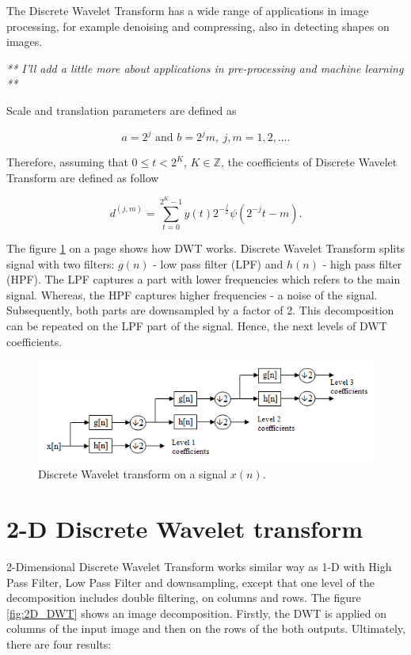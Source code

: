 The Discrete Wavelet Transform has a wide range of applications in image processing, for example denoising and compressing, also in detecting shapes on images.

\textit{** I'll add a little more about applications in pre-processing and machine learning **}

Scale and translation parameters are defined as

\begin{equation}
a = 2^j \text{ and } b = 2^j m,\ j,m=1,2,\ldots.
\end{equation}

Therefore, assuming that $0 \leq t < 2^K$, $K \in \mathbb{Z}$, the coefficients of Discrete Wavelet Transform are defined as follow

\begin{equation}
d^{(j,m)}=\sum_{t=0}^{2^K -1} y(t) 2^{-\frac{j}{2}} \psi\left(2^{-j}t - m\right).
\end{equation}

The figure \ref{fig:DWT} on a page \pageref{fig:DWT} shows how DWT works. Discrete Wavelet Transform splits signal with two filters: $g(n)$ - low pass filter (LPF) and $h(n)$ - high pass filter (HPF). The LPF captures a part with lower frequencies which refers to the main signal. Whereas, the HPF captures higher frequencies - a noise of the signal. Subsequently, both parts are downsampled by a factor of 2. This decomposition can be repeated on the LPF part of the signal. Hence, the next levels of DWT coefficients.

\begin{figure}[h]
	\centering
	\includegraphics[width=\textwidth]{DWT.png}
	\caption{Discrete Wavelet transform on a signal $x(n)$.}
	\label{fig:DWT}
\end{figure}


\section{2-D Discrete Wavelet transform}
\label{sec:2D_DWT}

2-Dimensional Discrete Wavelet Transform works similar way as 1-D with High Pass Filter, Low Pass Filter and downsampling, except that one level of the decomposition includes double filtering, on columns and rows. The figure \ref{fig:2D_DWT} shows an image decomposition. Firstly, the DWT is applied on columns of the input image and then on the rows of the both outputs. Ultimately, there are four results:

